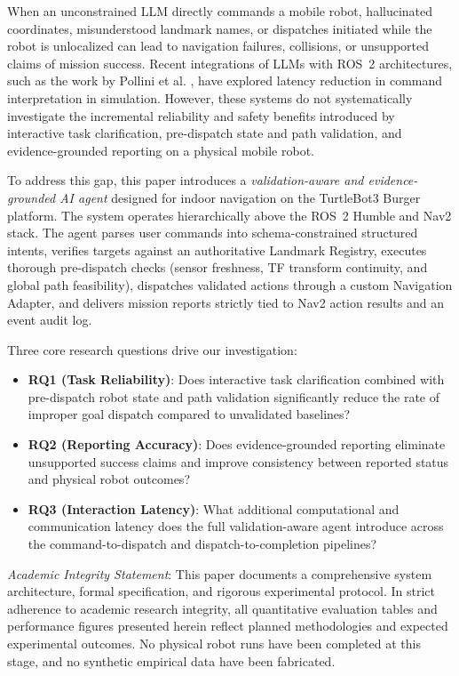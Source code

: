\documentclass[conference]{IEEEtran}
\begin{document}
When an unconstrained LLM directly commands a mobile robot, hallucinated coordinates, misunderstood landmark names, or dispatches initiated while the robot is unlocalized can lead to navigation failures, collisions, or unsupported claims of mission success. Recent integrations of LLMs with ROS~2 architectures, such as the work by Pollini et al. \cite{Pollini2025latency}, have explored latency reduction in command interpretation in simulation. However, these systems do not systematically investigate the incremental reliability and safety benefits introduced by interactive task clarification, pre-dispatch state and path validation, and evidence-grounded reporting on a physical mobile robot.

To address this gap, this paper introduces a \textit{validation-aware and evidence-grounded AI agent} designed for indoor navigation on the TurtleBot3 Burger platform. The system operates hierarchically above the ROS~2 Humble and Nav2 stack. The agent parses user commands into schema-constrained structured intents, verifies targets against an authoritative Landmark Registry, executes thorough pre-dispatch checks (sensor freshness, TF transform continuity, and global path feasibility), dispatches validated actions through a custom Navigation Adapter, and delivers mission reports strictly tied to Nav2 action results and an event audit log.

Three core research questions drive our investigation:
\begin{itemize}
    \item \textbf{RQ1 (Task Reliability)}: Does interactive task clarification combined with pre-dispatch robot state and path validation significantly reduce the rate of improper goal dispatch compared to unvalidated baselines?
    \item \textbf{RQ2 (Reporting Accuracy)}: Does evidence-grounded reporting eliminate unsupported success claims and improve consistency between reported status and physical robot outcomes?
    \item \textbf{RQ3 (Interaction Latency)}: What additional computational and communication latency does the full validation-aware agent introduce across the command-to-dispatch and dispatch-to-completion pipelines?
\end{itemize}

\textit{Academic Integrity Statement}: This paper documents a comprehensive system architecture, formal specification, and rigorous experimental protocol. In strict adherence to academic research integrity, all quantitative evaluation tables and performance figures presented herein reflect planned methodologies and expected experimental outcomes. No physical robot runs have been completed at this stage, and no synthetic empirical data have been fabricated.
\end{document}
